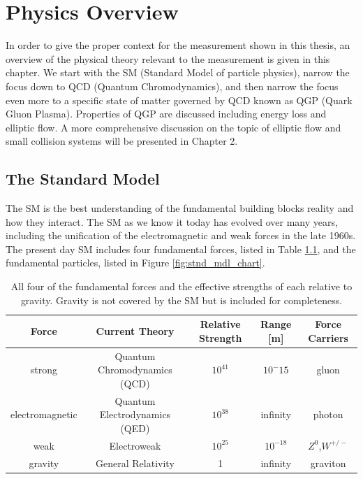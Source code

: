 \chapter{Physics Overview}
In order to give the proper context for the measurement shown in this thesis,  an overview of the physical theory relevant to the measurement is given in this chapter. We start with the SM (Standard Model of particle physics), narrow the focus down to QCD (Quantum Chromodynamics), and then narrow the focus even more to a specific state of matter governed by QCD known as QGP (Quark Gluon Plasma). Properties of QGP are discussed including energy loss and elliptic flow. A more comprehensive discussion on the topic of elliptic flow and small collision systems will be presented in Chapter 2.
\section{The Standard Model}
The SM is the best understanding of the fundamental building blocks reality and how they interact. The SM as we know it today has evolved over many years, including the unification of the electromagnetic and weak forces in the late 1960s. The present day SM includes four fundamental forces, listed in Table \ref{tbl:sm}, and the fundamental particles, listed in Figure \ref{fig:stnd_mdl_chart}.
\begin{table}[h!]
\caption{All four of the fundamental forces and the effective strengths of each relative to gravity. Gravity is not covered by the SM but is included for completeness.}
\begin{center}
    \begin{tabular}{ccccc}
    \hline
    Force &Current Theory  & Relative Strength & Range [m] &  Force Carriers\\ \hline
    strong  & Quantum Chromodynamics (QCD) & $10^{41}$ & $10^-{15}$&  gluon\\
    electromagnetic &Quantum Electrodynamics (QED) & $10^{38}$ & infinity &  photon\\
    weak & Electroweak & $10^{25}$ &  $10^{-18}$ & $Z^0$,$W^{+/-}$\\
    gravity & General Relativity & 1 & infinity & graviton\\ \hline
    \end{tabular}
\end{center}
\label{tbl:sm}
\end{table}


